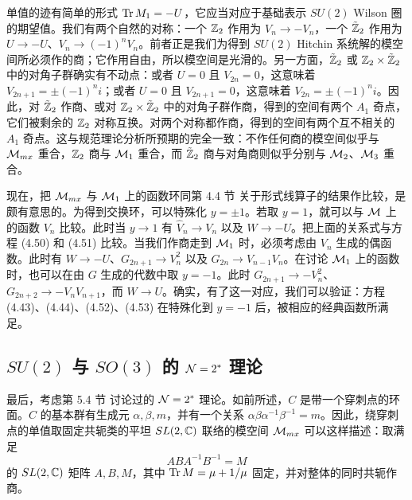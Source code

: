 单值的迹有简单的形式 $\operatorname{Tr} M_1=-U$，它应当对应于基础表示 $SU(2)$ Wilson 圈的期望值。我们有两个自然的对称：一个 $\mathbb{Z}_2$ 作用为 $V_n\to -V_n$，一个 $\tilde{\mathbb{Z}}_2$ 作用为 $U\to -U$、$V_n\to(-1)^nV_n$。前者正是我们为得到 $SU(2)$ Hitchin 系统解的模空间所必须作的商；它作用自由，所以模空间是光滑的。另一方面，$\tilde{\mathbb{Z}}_2$ 或 $\mathbb{Z}_2\times\tilde{\mathbb{Z}}_2$ 中的对角子群确实有不动点：或者 $U=0$ 且 $V_{2n}=0$，这意味着 $V_{2n+1}=\pm(-1)^ni$；或者 $U=0$ 且 $V_{2n+1}=0$，这意味着 $V_{2n}=\pm(-1)^ni$。因此，对 $\tilde{\mathbb{Z}}_2$ 作商、或对 $\mathbb{Z}_2\times\tilde{\mathbb{Z}}_2$ 中的对角子群作商，得到的空间有两个 $A_1$ 奇点，它们被剩余的 $\mathbb{Z}_2$ 对称互换。对两个对称都作商，得到的空间有两个互不相关的 $A_1$ 奇点。这与规范理论分析所预期的完全一致：不作任何商的模空间似乎与 $\mathcal{M}_{mx}$ 重合，$\mathbb{Z}_2$ 商与 $\mathcal{M}_1$ 重合，而 $\tilde{\mathbb{Z}}_2$ 商与对角商则似乎分别与 $\mathcal{M}_2$、$\mathcal{M}_3$ 重合。

现在，把 $\mathcal{M}_{mx}$ 与 $\mathcal{M}_1$ 上的函数环同第 4.4 节%
关于形式线算子的结果作比较，是颇有意思的。为得到交换环，可以特殊化 $y=\pm1$。若取 $y=1$，就可以与 $\mathcal{M}$ 上的函数 $V_n$ 比较。此时当 $y\to 1$ 有 $\hat V_n\to V_n$ 以及 $W\to -U$。把上面的关系式与方程 (4.50)%
和 (4.51)%
比较。当我们作商走到 $\mathcal{M}_1$ 时，必须考虑由 $V_n$ 生成的偶函数。此时有 $W\to -U$、$G_{2n+1}\to V_n^2$ 以及 $G_{2n}\to V_{n-1}V_n$。在讨论 $\mathcal{M}_1$ 上的函数时，也可以在由 $G$ 生成的代数中取 $y=-1$。此时 $G_{2n+1}\to -V_n^2$、$G_{2n+2}\to -V_nV_{n+1}$，而 $W\to U$。确实，有了这一对应，我们可以验证：方程 (4.43)、(4.44)、(4.52)、(4.53)%
在特殊化到 $y=-1$ 后，被相应的经典函数所满足。

\subsection{$SU(2)$ 与 $SO(3)$ 的 $\mathcal{N}=2^*$ 理论}\label{subsec:N2-star-moduli}

最后，考虑第 5.4 节%
讨论过的 $\mathcal{N}=2^*$ 理论。如前所述，$C$ 是带一个穿刺点的环面。$C$ 的基本群有生成元 $\alpha,\beta,m$，并有一个关系 $\alpha\beta\alpha^{-1}\beta^{-1}=m$。因此，绕穿刺点的单值取固定共轭类的平坦 $SL(2,\mathbb{C})$ 联络的模空间 $\mathcal{M}_{mx}$ 可以这样描述：取满足
\begin{equation}\label{eq:monod-equa-nstar}
ABA^{-1} B^{-1} = M
\end{equation}
的 $SL(2,\mathbb{C})$ 矩阵 $A,B,M$，其中 $\operatorname{Tr} M=\mu+1/\mu$ 固定，并对整体的同时共轭作商。

